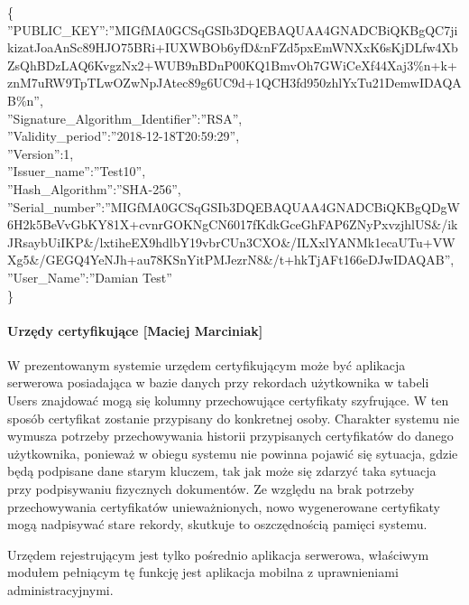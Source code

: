 		{\footnotesize  \{\\
			''PUBLIC\_KEY'':''MIGfMA0GCSqGSIb3DQEBAQUAA4GNADCBiQKBgQC7jik\linebreak izatJoaAnSc89HJO75BRi+IUXWBOb6yfD\&nFZd5pxEmWNXxK6sKjDLfw4XbZ\linebreak sQhBDzLAQ6KvgzNx2+WUB9nBDnP00KQ1BmvOh7GWiCeXf44Xaj3\%n+k+znM7\linebreak uRW9TpTLwOZwNpJAtec89g6UC9d+1QCH3fd950zhlYxTu21DemwIDAQAB\%n'',\\
			''Signature\_Algorithm\_Identifier'':''RSA'',\\
			''Validity\_period'':''2018-12-18T20:59:29'',\\
			''Version'':1,\\
			''Issuer\_name'':''Test10'',\\
			''Hash\_Algorithm'':''SHA-256'',\\
			''Serial\_number'':''MIGfMA0GCSqGSIb3DQEBAQUAA4GNADCBiQKBgQD\linebreak gW6H2k5BeVvGbKY81X+cvnrGOKNgCN6017fKdkGceGhFAP6ZNyPxvzjhlUS\&\linebreak /ikJRsaybUiIKP\&/lxtiheEX9hdlbY19vbrCUn3CXO\&/ILXxlYANMk1eca\linebreak UTu+VWXg5\&/GEGQ4YeNJh+au78KSnYitPMJezrN8\&/t+hkTjAFt166eDJw\linebreak IDAQAB'',\\
			''User\_Name'':''Damian Test''  \\
		\}}
								 
		\paragraph*{Urzędy certyfikujące [Maciej Marciniak]}
		W prezentowanym systemie urzędem certyfikującym może być aplikacja serwerowa posiadająca w bazie danych przy rekordach użytkownika w tabeli Users znajdować mogą się kolumny przechowujące certyfikaty szyfrujące. W ten sposób certyfikat zostanie przypisany do konkretnej osoby. Charakter systemu nie wymusza potrzeby przechowywania historii przypisanych certyfikatów do danego użytkownika, ponieważ w obiegu systemu nie powinna pojawić się sytuacja, gdzie będą podpisane dane starym kluczem, tak jak może się zdarzyć taka sytuacja przy podpisywaniu fizycznych dokumentów. Ze względu na brak potrzeby przechowywania certyfikatów unieważnionych, nowo wygenerowane certyfikaty mogą nadpisywać stare rekordy, skutkuje to oszczędnością pamięci systemu. 
		
		Urzędem rejestrującym jest tylko pośrednio aplikacja serwerowa, właściwym modułem pełniącym tę funkcję jest aplikacja mobilna z uprawnieniami administracyjnymi.

